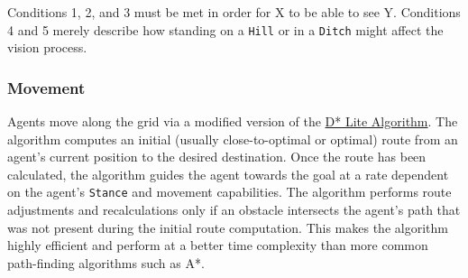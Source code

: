 \documentclass[a4paper,english,DIV=16,11pt,parskip=half,dvipsnames,listof=totoc,index=totoc,bibliography=totoc]{scrartcl}
\begin{document}
%
Conditions 1, 2, and 3 must be met in order for X to be able to see Y. Conditions 4 and 5 merely describe how standing on a \texttt{Hill} or in a \texttt{Ditch} might affect the vision process.
%
\subsubsection{Movement} \label{sssec:movement}
Agents move along the grid via a modified version of the \href{http://idm-lab.org/bib/abstracts/papers/aaai02b.pdf}{D* Lite Algorithm}. The algorithm computes an initial (usually close-to-optimal or optimal) route from an agent's current position to the desired destination. Once the route has been calculated, the algorithm guides the agent towards the goal at a rate dependent on the agent's \texttt{Stance} and movement capabilities. The algorithm performs route adjustments and recalculations only if an obstacle intersects the agent's path that was not present during the initial route computation. This makes the algorithm highly efficient and perform at a better time complexity than more common path-finding algorithms such as A*.
%
\end{document}
